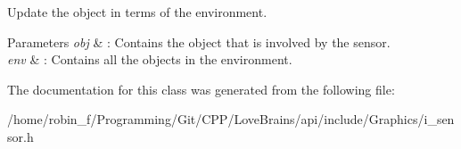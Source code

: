 Update the object in terms of the environment. 


\begin{DoxyParams}{Parameters}
{\em obj} & \+: Contains the object that is involved by the sensor. \\
\hline
{\em env} & \+: Contains all the objects in the environment. \\
\hline
\end{DoxyParams}


The documentation for this class was generated from the following file\+:\begin{DoxyCompactItemize}
\item 
/home/robin\+\_\+f/\+Programming/\+Git/\+C\+P\+P/\+Love\+Brains/api/include/\+Graphics/i\+\_\+sensor.\+h\end{DoxyCompactItemize}
